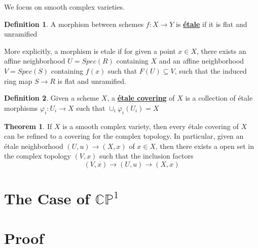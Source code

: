 \documentclass{article}
\theoremstyle{definition}
\newtheorem{theorem}{Theorem}[section]
\theoremstyle{definition}
\newtheorem{definition}{Definition}[theorem]
\theoremstyle{definition}
\theoremstyle{definition}
\theoremstyle{definition}
\theoremstyle{definition}
\theoremstyle{definition}
\begin{document}
We focus on smooth complex varieties.
\begin{tcolorbox}[colback=purple!5!white,colframe=purple!75!black]
\begin{definition}
A morphism between schemes $f: X\to Y$ is \underline{\textbf{\'etale}} if it is flat and unramified 
\end{definition}
\end{tcolorbox}
More explicitly, a morphism is etale if for given a point $x\in X$, there exists an affine neighborhood $U=Spec(R)$ containing $X$ and an affine neighborhood $V=Spec(S)$ containing $f(x)$ such that $F(U)\subseteq V$, such that the induced ring map $S\to R$ is flat and unramified. 


\begin{tcolorbox}[colback=purple!5!white,colframe=purple!75!black]
\begin{definition}
Given a scheme $X$, a \underline{\textbf{\'etale covering}} of $X$ is a collection of \'etale morphisms $\varphi_i: U_i\to X$ such that $\cup_i \varphi_i(U_i)=X$
\end{definition}
\end{tcolorbox}


\begin{tcolorbox}[colback=red!5!white,colframe=red!30!white]
\begin{theorem}
If $X$ is a smooth complex variety, then every \'etale covering of $X$ can be refined to a covering for the complex topology. In particular, given an \'etale neighborhood $(U,u)\to (X,x)$ of $x\in X$, then there exists a open set in the complex topology $(V,x)$ such that the inclusion factors 
\[(V,x)\to (U,u)\to (X,x)\]
\end{theorem}
\end{tcolorbox}




\section{The Case of $\mathbb{CP}^1$}

\section{Proof}
\end{document}
